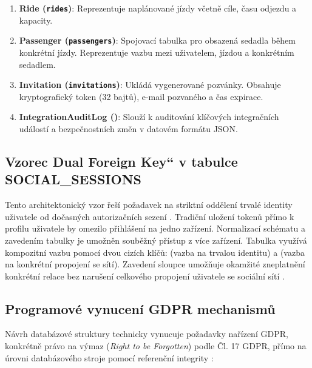 \documentclass[male,czech,api_bc]{kitheses}
\newcommand{\UV}[1]{\quotedblbase#1\textquotedblleft}
\begin{document}
\begin{enumerate}
\item \textbf{Ride (\texttt{rides})}: Reprezentuje naplánované jízdy včetně cíle, času odjezdu a kapacity.

\item \textbf{Passenger (\texttt{passengers})}: Spojovací tabulka pro obsazená sedadla během konkrétní jízdy. Reprezentuje vazbu mezi uživatelem, jízdou a konkrétním sedadlem.

\item \textbf{Invitation (\texttt{invitations})}: Ukládá vygenerované pozvánky. Obsahuje kryptografický token (32 bajtů), e-mail pozvaného a čas expirace.

\item \textbf{IntegrationAuditLog ()}: Slouží k auditování klíčových integračních událostí a bezpečnostních změn v datovém formátu JSON.

\end{enumerate}

\subsection{Vzorec \UV{Dual Foreign Key} v tabulce SOCIAL\_SESSIONS}

Tento architektonický vzor řeší požadavek na striktní oddělení trvalé identity uživatele od dočasných autorizačních sezení \cite{Andrushchak202661}. Tradiční uložení tokenů přímo k profilu uživatele by omezilo přihlášení na jedno zařízení. Normalizací schématu a zavedením tabulky  je umožněn souběžný přístup z více zařízení. Tabulka využívá kompozitní vazbu pomocí dvou cizích klíčů:  (vazba na trvalou identitu) a  (vazba na konkrétní propojení se sítí). Zavedení sloupce  umožňuje okamžité zneplatnění konkrétní relace bez narušení celkového propojení uživatele se sociální sítí \cite{Rujichaikul20251014}.

\subsection{Programové vynucení GDPR mechanismů}
\label{sec:gdpr_mechanismy}

Návrh databázové struktury technicky vynucuje požadavky nařízení GDPR, konkrétně právo na výmaz (\textit{Right to be Forgotten}) podle Čl. 17 GDPR, přímo na úrovni databázového stroje pomocí referenční integrity \cite{Paisner25cervence2017,GDPR2016}:
\end{document}
